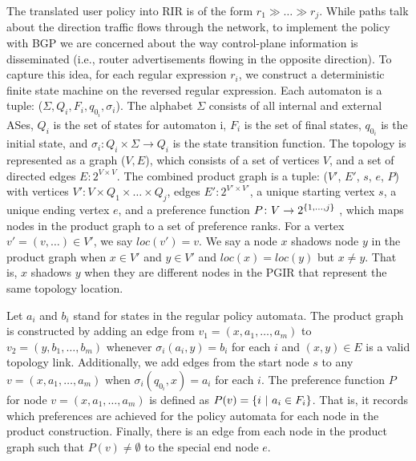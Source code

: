 
The translated user policy into RIR is of the form $r_1 \gg \dots \gg r_j$. While paths talk about the direction traffic flows through the network, to implement the policy with BGP we are concerned about the way control-plane information is disseminated (i.e., router advertisements flowing in the opposite direction). To capture this idea, for each regular expression $r_i$, we construct a deterministic finite state machine on the reversed regular expression. Each automaton is a tuple: ($\Sigma, Q_i, F_i, q_{0_i}, \sigma_i$). The alphabet $\Sigma$ consists of all internal and external ASes, $Q_i$ is the set of states for automaton i, $F_i$ is the set of final states, $q_{0_i}$ is the initial state, and $\sigma_i \colon Q_i \times \Sigma \rightarrow Q_i$ is the state transition function.
%
The topology is represented as a graph ($V, E$), which consists of a set of vertices $V$, and a set of directed edges $E \colon 2^{V \times V}$.
%
The combined product graph is a tuple: ($V'$, $E'$, $s$, $e$, $P$) with
vertices $V' \colon V \times Q_1 \times \dots \times Q_j$,
edges $E' \colon 2^{V' \times V'}$,
a unique starting vertex $s$,
a unique ending vertex $e$,
and a preference function $P \colon V \rightarrow 2^{\{ 1, \dots, j \} }$ , which maps nodes in the product graph to a set of preference ranks.
For a vertex $v' = (v, \dots) \in V'$, we say $loc(v') = v$. We say a node $x$ shadows node $y$ in the product graph when $x \in V'$ and $y \in V'$ and $loc(x) = loc(y)$ but $x \neq y$. That is, $x$ shadows $y$ when they are different nodes in the PGIR that represent the same topology location.


Let $a_i$ and $b_i$ stand for states in the regular policy automata.
The product graph is constructed by adding an edge from $v_1 = (x, a_1, \dots, a_m)$ to $v_2 = (y, b_1, \dots, b_m)$ whenever $\sigma_i(a_i, y) = b_i$ for each $i$ and $(x,y) \in E$ is a valid topology link.
%
Additionally, we add edges from the start node $s$ to any $v = (x, a_1, \dots, a_m)$ when $\sigma_i(q_{0_i}, x) = a_i$ for each $i$.
%
The preference function $P$ for node $v = (x, a_1, \dots, a_m)$ is defined as $P(v) = \{ i~\vert~a_i \in F_i \}  $. That is, it records which preferences are achieved for the policy automata for each node in the product construction.
%
Finally, there is an edge from each node in the product graph such that $P(v) \neq \emptyset$ to the special end node $e$.


